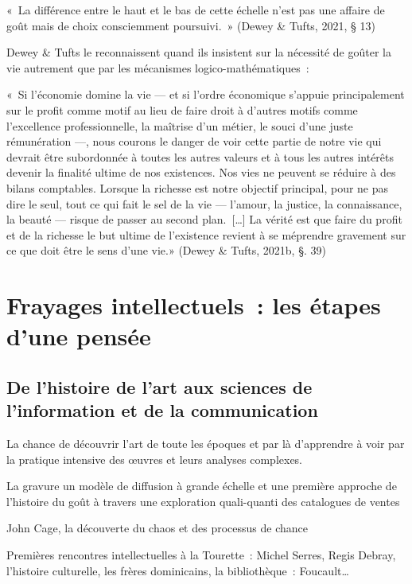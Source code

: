 \documentclass[
  letterpaper,
  DIV=11,
  numbers=noendperiod]{scrreprt}
\begin{document}
«~La différence entre le haut et le bas de cette échelle n'est pas une
affaire de goût mais de choix consciemment poursuivi.~» (Dewey \& Tufts,
2021, § 13)

Dewey \& Tufts le reconnaissent quand ils insistent sur la nécessité de
goûter la vie autrement que par les mécanismes logico-mathématiques~:

«~Si l'économie domine la vie --- et si l'ordre économique s'appuie
principalement sur le profit comme motif au lieu de faire droit à
d'autres motifs comme l'excellence professionnelle, la maîtrise d'un
métier, le souci d'une juste rémunération ---, nous courons le danger de
voir cette partie de notre vie qui devrait être subordonnée à toutes les
autres valeurs et à tous les autres intérêts devenir la finalité ultime
de nos existences. Nos vies ne peuvent se réduire à des bilans
comptables. Lorsque la richesse est notre objectif principal, pour ne
pas dire le seul, tout ce qui fait le sel de la vie --- l'amour, la
justice, la connaissance, la beauté --- risque de passer au second
plan.~{[}\ldots{]} La vérité est que faire du profit et de la richesse
le but ultime de l'existence revient à se méprendre gravement sur ce que
doit être le sens d'une vie.» (Dewey \& Tufts, 2021b, §. 39)

\hypertarget{sec-frayages}{%
\chapter{Frayages intellectuels~: les étapes d'une
pensée}\label{sec-frayages}}

\hypertarget{de-lhistoire-de-lart-aux-sciences-de-linformation-et-de-la-communication}{%
\section{De l'histoire de l'art aux sciences de l'information et de la
communication}\label{de-lhistoire-de-lart-aux-sciences-de-linformation-et-de-la-communication}}

La chance de découvrir l'art de toute les époques et par là d'apprendre
à voir par la pratique intensive des œuvres et leurs analyses complexes.

La gravure un modèle de diffusion à grande échelle et une première
approche de l'histoire du goût à travers une exploration quali-quanti
des catalogues de ventes

John Cage, la découverte du chaos et des processus de chance

Premières rencontres intellectuelles à la Tourette~: Michel Serres,
Regis Debray, l'histoire culturelle, les frères dominicains, la
bibliothèque~: Foucault\ldots{}
\end{document}
